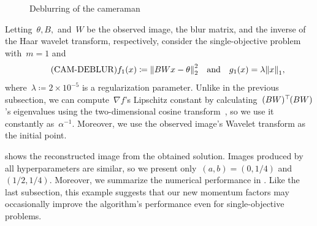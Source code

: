 \documentclass[../main]{subfiles}
\begin{document}
\begin{figure}[htpb]
\begin{minipage}[b]{.45\hsize}
    \end{minipage}
    \caption{Deblurring of the cameraman}
\end{figure}

Letting~$\theta, B,$ and~$W$ be the observed image, the blur matrix, and the inverse of the Haar wavelet transform, respectively, consider the single-objective problem~ with~$m = 1$ and
\begin{equation} \label{eq:cam_deblur} \tag{CAM-DEBLUR}
    f_1(x) \coloneqq \norm*{BWx - \theta}_2^2 \eqand g_1(x)=\lambda \norm*{x}_1
,\end{equation} 
where~$\lambda \coloneqq 2 \times 10^{-5}$ is a regularization parameter.
Unlike in the previous subsection, we can compute~$\nabla f$'s Lipschitz constant by calculating~$(BW)^\top\hspace{-1pt}(BW)$'s eigenvalues using the two-dimensional cosine transform~\cite{Hansen2006}, so we use it constantly as~$\alpha^{-1}$.
Moreover, we use the observed image's Wavelet transform as the initial point.

 shows the reconstructed image from the obtained solution.
Images produced by all hyperparameters are similar, so we present only~$(a, b) = (0, 1 / 4)$ and~$(1 / 2, 1 / 4)$.
Moreover, we summarize the numerical performance in .
Like the last subsection, this example suggests that our new momentum factors may occasionally improve the algorithm's performance even for single-objective problems.
\end{document}
